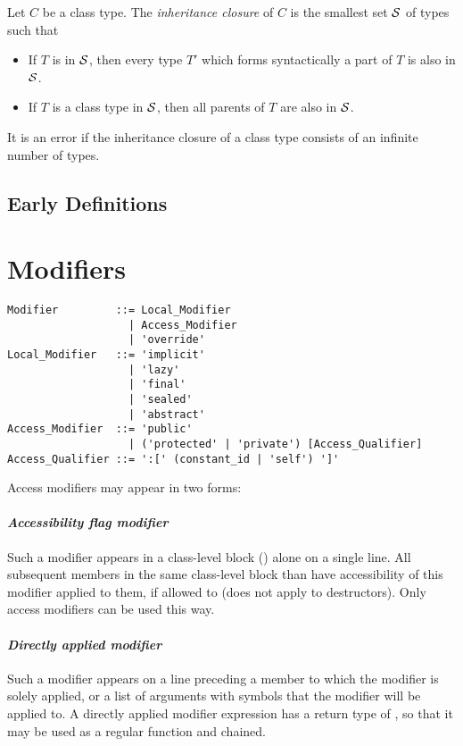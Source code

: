 Let $C$ be a class type. The {\em inheritance closure} of $C$ is the smallest set ${\cal S}$ of types such that
\begin{itemize}
\item If $T$ is in ${\cal S}$, then every type $T'$ which forms syntactically a part of $T$ is also in ${\cal S}$. 
\item If $T$ is a class type in ${\cal S}$, then all parents of $T$ are also in ${\cal S}$. 
\end{itemize}
It is an error if the inheritance closure of a class type consists of an infinite number of types. 

\subsection{Early Definitions}
\label{sec:early-defs}

\section{Modifiers}
\label{sec:modifiers}

\syntax\begin{lstlisting}
Modifier         ::= Local_Modifier
                   | Access_Modifier
                   | 'override'
Local_Modifier   ::= 'implicit'
                   | 'lazy'
                   | 'final'
                   | 'sealed'
                   | 'abstract'
Access_Modifier  ::= 'public'
                   | ('protected' | 'private') [Access_Qualifier]
Access_Qualifier ::= ':[' (constant_id | 'self') ']'
\end{lstlisting}

Access modifiers may appear in two forms:

\paragraph{\em Accessibility flag modifier}
Such a modifier appears in a class-level block () alone on a single line. All subsequent members in the same class-level block than have accessibility of this modifier applied to them, if allowed to (does not apply to destructors). Only access modifiers can be used this way. 

\paragraph{\em Directly applied modifier}
Such a modifier appears on a line preceding a member to which the modifier is solely applied, or a list of arguments with symbols that the modifier will be applied to. A directly applied modifier expression has a return type of , so that it may be used as a regular function and chained. 

